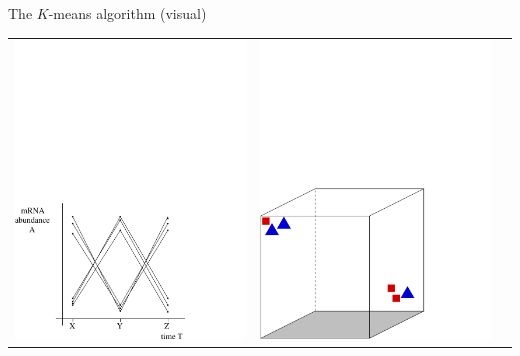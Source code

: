 \documentclass{beamer}
\begin{document}
\begin{frame}{The $K$-means algorithm (visual)}
\begin{tabular}{ccc}
\includegraphics[height=0.4\textheight]{3d-data.pdf}
&
\includegraphics[height=0.4\textheight]{3d-kmeans1.pdf}

\end{tabular}
\end{frame}
\end{document}
